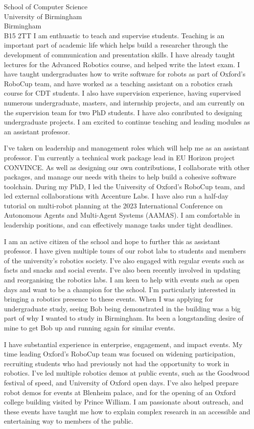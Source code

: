 \documentclass[12pt]{letter}
\begin{document}
\begin{letter}{School of Computer Science \\ University of Birmingham \\ Birmingham \\ B15 2TT}
I am enthuastic to teach and supervise students.
%
Teaching is an important part of academic life which helps build a researcher through the development of communication and presentation skills.
%
I have already taught lectures for the Advanced Robotics course, and helped write the latest exam.
%
I have taught undergraduates how to write software for robots as part of Oxford's RoboCup team, and have worked as a teaching assistant on a robotics crash course for CDT students.
%
I also have supervision experience, having supervised numerous undergraduate, masters, and internship projects, and am currently on the supervision team for two PhD students.
%
I have also conributed to designing undergraduate projects.
%
I am excited to continue teaching and leading modules as an assistant professor.

I've taken on leadership and management roles which will help me as an assistant professor.
%
I'm currently a technical work package lead in EU Horizon project CONVINCE.
%
As well as designing our own contributions, I collaborate with other packages, and manage our needs with theirs to help build a cohesive software toolchain.
%
During my PhD, I led the University of Oxford's RoboCup team, and led external collaborations with Accenture Labs.
%
I have also run a half-day tutorial on multi-robot planning at the 2023 International Conference on Autonomous Agents and Multi-Agent Systems (AAMAS).
%
I am comfortable in leadership positions, and can effectively manage tasks under tight deadlines.

I am an active citizen of the school and hope to further this as assistant professor.
%
I have given multiple tours of our robot labs to students and members of the university's robotics society.
%
I've also engaged with regular events such as facts and snacks and social events.
%
I've also been recently involved in updating and reorganising the robotics labs.
%
I am keen to help with events such as open days and want to be a champion for the school.
%
I'm particularly interested in bringing a robotics presence to these events.
%
When I was applying for undergraduate study, seeing Bob being demonstrated in the building was a big part of why I wanted to study in Birmingham.
%
Its been a longstanding desire of mine to get Bob up and running again for similar events.


I have substantial experience in enterprise, engagement, and impact events.
%
My time leading Oxford's RoboCup team was focused on widening participation, recruiting students who had previously not had the opportunity to work in robotics.
%
I've led multiple robotics demos at public events, such as the Goodwood festival of speed, and University of Oxford open days.
%
I've also helped prepare robot demos for events at Blenheim palace, and for the opening of an Oxford college building visited by Prince William. 
%
I am passionate about outreach, and these events have taught me how to explain complex research in an accessible and entertaining way to members of the public.


\end{letter}
\end{document}
